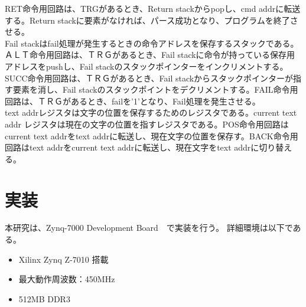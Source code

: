 \documentclass[12pt,oneside]{report}
\begin{document}
RET命令用回路は、TRGがあるとき、Return stackからpopし、cmd addrに転送する。Return stackに要素がなければ、パース成功となり、プログラムを終了させる。\\
Fail stackはfail処理が発生するときの命令アドレスを保存するスタックである。
ＡＬＴ命令用回路は、ＴＲＧがあるとき、Fail stackに命令が持っている保存用アドレスをpushし、Fail stackのスタックポインターをインクリメントする。\\

SUCC命令用回路は、ＴＲＧがあるとき、Fail stackからスタックポインターが指す要素を消し、Fail stackのスタックポイントをデクリメントする。FAIL命令用回路は、ＴＲＧがあるとき、failを'1'となり、Fail処理を発生させる。\\

text addrレジスタは文字の位置を保存するためのレジスタである。current text addr レジスタは現在の文字の位置を指すレジスタである。POS命令用回路はcurrent text addrをtext addrに転送し、現在文字の位置を保存す。BACK命令用回路はtext addrをcurrent text addrに転送し、現在文字をtext addrに切り替える。






\chapter{実装}
\label{impr}
本研究は、Zynq-7000 Development Board　で実装を行う。
詳細環境は以下である。
\begin{itemize}
\item Xilinx Zynq Z-7010 搭載
\item 最大動作周波数：450MHz
\item 512MB DDR3
\end{itemize}
\end{document}
